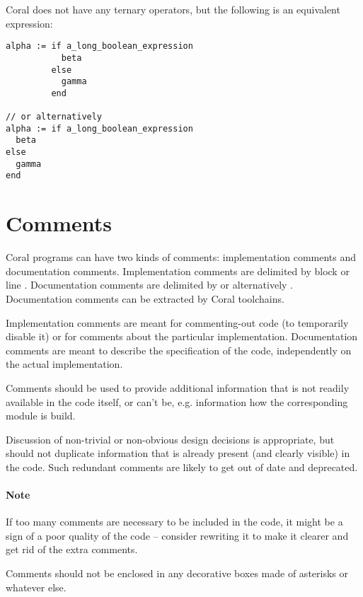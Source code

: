 \example Coral does not have any ternary operators, but the following is an equivalent expression:

\begin{lstlisting}
alpha := if a_long_boolean_expression
           beta
         else
           gamma
         end

// or alternatively
alpha := if a_long_boolean_expression
  beta
else
  gamma
end
\end{lstlisting}





\section{Comments}

Coral programs can have two kinds of comments: implementation comments and documentation comments. Implementation comments are delimited by block \code{/* $\ \ldots$ */} or line \code{//}. Documentation comments are delimited by \code{/*! $\ \ldots$ */} or alternatively \code{/** $\ \ldots$ */}. Documentation comments can be extracted by Coral toolchains. 

Implementation comments are meant for commenting-out code (to temporarily disable it) or for comments about the particular implementation. Documentation comments are meant to describe the specification of the code, independently on the actual implementation. 

Comments should be used to provide additional information that is not readily available in the code itself, or can't be, e.g. information how the corresponding module is build. 

Discussion of non-trivial or non-obvious design decisions is appropriate, but should not duplicate information that is already present (and clearly visible) in the code. Such redundant comments are likely to get out of date and deprecated. 

\paragraph{Note}
If too many comments are necessary to be included in the code, it might be a sign of a poor quality of the code -- consider rewriting it to make it clearer and get rid of the extra comments. 

Comments should not be enclosed in any decorative boxes made of asterisks or whatever else. 





